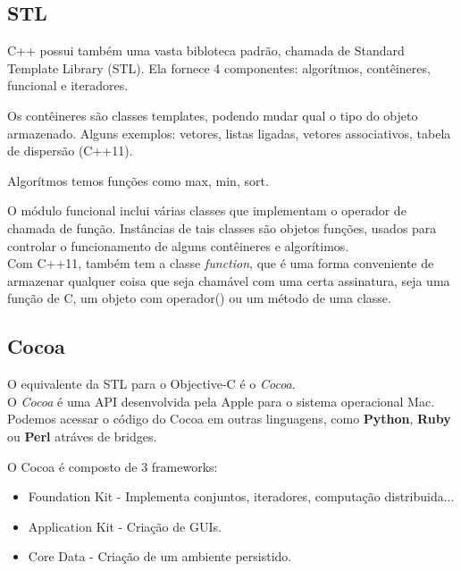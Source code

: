 \documentclass[brazil]{beamer}
\begin{document}
\subsection{STL}
\begin{frame}
  C++ possui também uma vasta bibloteca padrão, chamada de Standard Template Library (STL). 
  Ela fornece 4 componentes: algorítmos, contêineres, funcional e iteradores.
  
  \vfill
  
  Os contêineres são classes templates, podendo mudar qual o tipo do objeto armazenado. Alguns exemplos: vetores, listas ligadas, vetores associativos, tabela de dispersão (C++11).
  
  \vfill
  
  Algorítmos temos funções como max, min, sort.
\end{frame}
 
\begin{frame}  
  O módulo funcional inclui várias classes que implementam o operador de chamada de função. Instâncias de tais classes são objetos funções, usados para controlar o funcionamento de alguns contêineres e algorítimos. \\
  Com C++11, também tem a classe \textit{function}, que é uma forma conveniente de armazenar qualquer coisa que seja chamável com uma certa assinatura, seja uma função de C, um objeto com operador() ou um método de uma classe. 
\end{frame}

\subsection{Cocoa}
\begin{frame}
  O equivalente da STL para o Objective-C é o \textit{Cocoa}. \\
  O \textit{Cocoa} é uma API desenvolvida pela Apple para o sistema operacional Mac. \\
  Podemos acessar o código do Cocoa em outras linguagens, como \textbf{Python}, \textbf{Ruby} ou \textbf{Perl} atráves
  de bridges.
\end{frame}

\begin{frame}
  O Cocoa é composto de 3 frameworks:
  \begin{itemize}
    \item Foundation Kit - Implementa conjuntos, iteradores, computação distribuida...
    \item Application Kit - Criação de GUIs.
    \item Core Data - Criação de um ambiente persistido.
  \end{itemize}
\end{frame}
\end{document}
